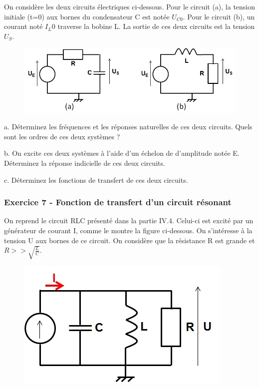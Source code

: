 \begin{remark}{}
	On considère les deux circuits électriques ci-dessous. Pour le
        circuit (a), la tension initiale (t=0) aux bornes du
        condensateur C est notée $U_{C0}$. Pour le circuit (b), un
        courant noté $I_L0$ traverse la bobine L. La sortie de ces
        deux circuits est la tension $U_{S}$.
	
	\begin{figure}[htbp]
          \centering \includegraphics[scale=0.5]{images/Exo_2_4.jpg}
	\end{figure}
	
	a. Déterminez les fréquences et les réponses naturelles de ces
        deux circuits. Quels sont les ordres de ces deux systèmes ?
	
	b. On excite ces deux systèmes à l'aide d'un échelon de
        \Heaviside{} d'amplitude notée E. Déterminez la réponse
        indicielle de ces deux circuits.
	
	c. Déterminez les fonctions de transfert de ces deux circuits.
	
	\vspace{1\baselineskip}
	
	\subsubsection{Exercice 7 - Fonction de transfert d'un circuit
          résonant}
	
	On reprend le circuit RLC présenté dans la partie
        IV.4. Celui-ci est excité par un générateur de courant I,
        comme le montre la figure ci-dessous. On s'intéresse à la
        tension U aux bornes de ce circuit. On considère que la
        résistance R est grande et $R>>\sqrt{\frac{L}{C}}$.
 	 	
 	\begin{figure}[htbp]
          \centering \includegraphics[scale=0.5]{images/Exo_2_5.jpg}
 	\end{figure}
 

\end{remark}
